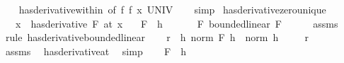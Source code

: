 \begin{isabellebody}
%
\isadelimproof
\ \ %
\endisadelimproof
%
\isatagproof
{}\isamarkupfalse%
\ has{\isacharunderscore}{\kern0pt}derivative{\isacharunderscore}{\kern0pt}within\ {\isacharbrackleft}{\kern0pt}of\ f\ f{\isacharprime}{\kern0pt}\ x\ UNIV{\isacharbrackright}{\kern0pt}\isanewline
\ \ \isamarkupfalse%
\ simp%
\endisatagproof
{\isafoldproof}%
%
\isadelimproof
\isanewline
%
\endisadelimproof
\isanewline
{}\isamarkupfalse%
\ has{\isacharunderscore}{\kern0pt}derivative{\isacharunderscore}{\kern0pt}zero{\isacharunderscore}{\kern0pt}unique{\isacharcolon}{\kern0pt}\isanewline
\ \ \ {\isachardoublequoteopen}{\isacharparenleft}{\kern0pt}{\isacharparenleft}{\kern0pt}{\isasymlambda}x{\isachardot}{\kern0pt}\ {}{\isacharparenright}{\kern0pt}\ has{\isacharunderscore}{\kern0pt}derivative\ F{\isacharparenright}{\kern0pt}\ {\isacharparenleft}{\kern0pt}at\ x{\isacharparenright}{\kern0pt}{\isachardoublequoteclose}\isanewline
\ \ \ {\isachardoublequoteopen}F\ {\isacharequal}{\kern0pt}\ {\isacharparenleft}{\kern0pt}{\isasymlambda}h{\isachardot}{\kern0pt}\ {}{\isacharparenright}{\kern0pt}{\isachardoublequoteclose}\isanewline
%
\isadelimproof
%
\endisadelimproof
%
\isatagproof
{}\isamarkupfalse%
\ {\isacharminus}{\kern0pt}\isanewline
\ \ \isamarkupfalse%
\ F{\isacharcolon}{\kern0pt}\ bounded{\isacharunderscore}{\kern0pt}linear\ F\isanewline
\ \ \ \ \isamarkupfalse%
\ assms\ \isamarkupfalse%
\ {\isacharparenleft}{\kern0pt}rule\ has{\isacharunderscore}{\kern0pt}derivative{\isacharunderscore}{\kern0pt}bounded{\isacharunderscore}{\kern0pt}linear{\isacharparenright}{\kern0pt}\isanewline
\ \ \isamarkupfalse%
\ {\isacharquery}{\kern0pt}r\ {\isacharequal}{\kern0pt}\ {\isachardoublequoteopen}{\isasymlambda}h{\isachardot}{\kern0pt}\ norm\ {\isacharparenleft}{\kern0pt}F\ h{\isacharparenright}{\kern0pt}\ {\isacharslash}{\kern0pt}\ norm\ h{\isachardoublequoteclose}\isanewline
\ \ \isamarkupfalse%
\ {\isacharasterisk}{\kern0pt}{\isacharcolon}{\kern0pt}\ {\isachardoublequoteopen}{\isacharquery}{\kern0pt}r\ {\isasymmidarrow}{}{\isasymrightarrow}\ {}{\isachardoublequoteclose}\isanewline
\ \ \ \ \isamarkupfalse%
\ assms\ \isamarkupfalse%
\ has{\isacharunderscore}{\kern0pt}derivative{\isacharunderscore}{\kern0pt}at\ \isamarkupfalse%
\ simp\isanewline
\ \ \isamarkupfalse%
\ {\isachardoublequoteopen}F\ {\isacharequal}{\kern0pt}\ {\isacharparenleft}{\kern0pt}{\isasymlambda}h{\isachardot}{\kern0pt}\ {}{\isacharparenright}{\kern0pt}{\isachardoublequoteclose}\isanewline

\end{isabellebody}
